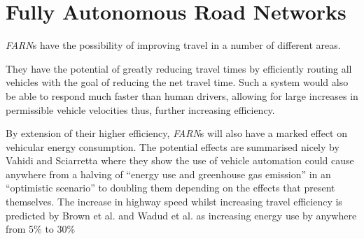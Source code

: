 \section{Fully Autonomous Road Networks}

\textit{FARN}s have the possibility of improving travel in a number of different areas. 

They have the potential of greatly reducing travel times by efficiently routing all vehicles with the goal of reducing the net travel time. Such a system would also be able to respond much faster than human drivers, allowing for large increases in permissible vehicle velocities thus, further increasing efficiency.

By extension of their higher efficiency, \textit{FARN}s will also have a marked effect on vehicular energy consumption. The potential effects are summarised nicely by Vahidi and Sciarretta\cite{vahidiEnergySavingPotentials2018} where they show the use of vehicle automation could cause anywhere from a halving of ``energy use and greenhouse gas emission'' in an ``optimistic scenario'' to doubling them depending on the effects that present themselves. The increase in highway speed whilst increasing travel efficiency is predicted by Brown et al.\cite{brownAnalysisPossibleEnergy2014} and Wadud et al.\cite{wadudHelpHindranceTravel2016} as increasing energy use by anywhere from 5\% to 30\%


